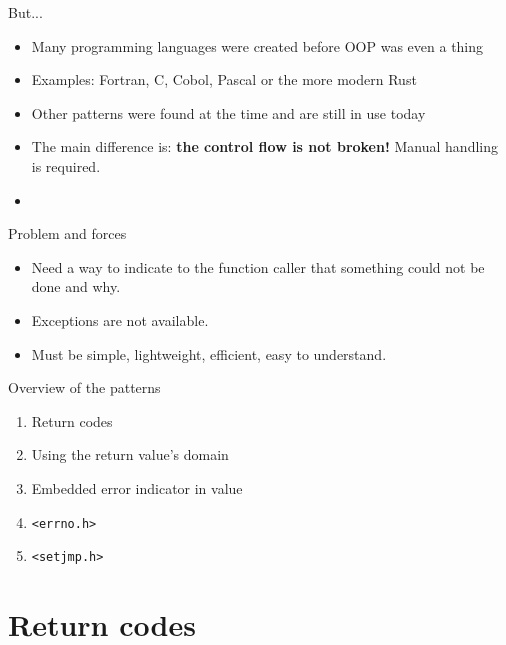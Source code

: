 \documentclass[aspectratio=169,14pt]{beamer}
\begin{document}
\begin{frame}{But...}
\begin{itemize}
    \item Many programming languages were created before OOP was even a thing
    \item Examples: Fortran, C, Cobol, Pascal or the more modern Rust
    \item Other patterns were found at the time and are still in use today
    \item The main difference is: \textbf{the control flow is not broken!} Manual handling is required.
    \item \textit{}
\end{itemize}
\end{frame}



\begin{frame}{Problem and forces}
\begin{itemize}
    \item Need a way to indicate to the function caller that something could not be done and why.
    \item Exceptions are not available.
    \item Must be simple, lightweight, efficient, easy to understand.
\end{itemize}
\end{frame}



\begin{frame}{Overview of the patterns}
\begin{enumerate}
    \item Return codes
    \item Using the return value's domain
    \item Embedded error indicator in value
    \item \texttt{<errno.h>}
    \item \texttt{<setjmp.h>}
\end{enumerate}
\end{frame}





\section{Return codes}
\end{document}
